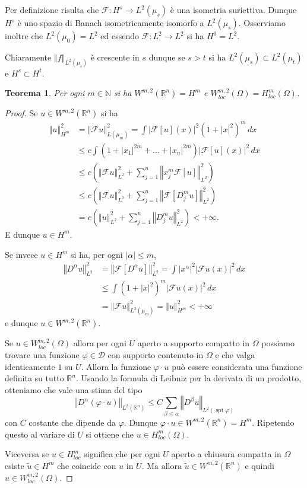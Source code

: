 \documentclass[italian,a4paper,oneside,headinclude]{scrbook}
\renewcommand{\phi}{\varphi}
\newcommand{\loc}{\mathit{loc}}
\newcommand{\D}{\mathcal D}
\newcommand{\F}{\mathcal F}
\newcommand{\NN}{\mathbb N}
\newcommand{\RR}{\mathbb R}
\newcommand{\abs}[1]{{\left|#1\right|}}
\newcommand{\Abs}[1]{{\left\Vert #1\right\Vert}}
\DeclareMathOperator{\spt}{spt}
\newtheorem{theorem}{Teorema}
\begin{document}
  Per definizione risulta che $\F \colon H^s \to L^2(\mu_s)$ è una
  isometria suriettiva. Dunque $H^s$ è uno spazio di Banach
  isometricamente isomorfo a $L^2(\mu_s)$. Osserviamo inoltre che
  $L^2(\mu_0) = L^2$ ed essendo $\F\colon L^2 \to L^2$ si ha
  $H^0=L^2$.

  Chiaramente $\Abs{f}_{L^2(\mu_s)}$ è crescente in $s$ dunque se
  $s>t$ si ha $L^2(\mu_s) \subset L^2(\mu_t)$ e $H^s \subset H^t$.

  \begin{theorem}
    Per ogni $m\in \NN$ si ha $W^{m,2}(\RR^n) = H^m$ e
    $W^{m,2}_\loc(\Omega) = H^m_\loc(\Omega)$.
  \end{theorem}
  \begin{proof}
    Se $u \in W^{m,2}(\RR^n)$ si ha
    \begin{align*}
      \Abs{u}_{H^m}^2
      &= \Abs{\F u}_{L(\mu_m)}^2
      = \int \abs{\F[u](x)}^2 (1+\abs{x}^2)^m\, dx \\
      &\le c \int (1+\abs{x_1}^{2m} + \dots + \abs{x_n}^{2m})
      \abs{\F[u](x)}^2\, dx \\
      & \le c \left( \Abs{\F u}_{L^2}^2 + \sum_{j=1}^n \Abs{x_j^m
        \F[u]}_{L^2}^2\right)\\
      &\le c \left( \Abs{\F u}_{L^2}^2 + \sum_{j=1}^n \Abs{\F[D_j^m
        u]}_{L^2}^2\right) \\
      & = c\left(\Abs{u}_{L^2}^2 + \sum_{j=1}^n \Abs{D_j^m u}_{L^2}^2\right)
      < +\infty.
    \end{align*}
    E dunque $u\in H^m$.

    Se invece $u\in H^m$ si ha, per ogni $\abs{\alpha}\le m$,
    \begin{align*}
      \Abs{D^\alpha u}_{L^2}^2
      & = \Abs{\F[D^\alpha u]}_{L^2}^2
      = \int \abs{x^\alpha}^2 \abs{\F u(x)}^2 \, dx \\
      &\le \int (1+\abs{x}^2)^m \abs{\F u(x)}^2\, dx \\
      &= \Abs{\F u}_{L^2(\mu_m)}^2 = \Abs{u}_{H^m}^2 < +\infty
    \end{align*}
    e dunque $u\in W^{m,2}(\RR^n)$.

    Se $u\in W^{m,2}_\loc(\Omega)$ allora per ogni $U$ aperto a
    supporto compatto in $\Omega$ possiamo trovare una funzione
    $\phi\in \D$ con supporto contenuto in $\Omega$ e che valga
    identicamente $1$ su $U$. Allora la funzione $\phi \cdot u$ può
    essere considerata una funzione definita su tutto $\RR^n$.
    Usando la formula di Leibniz per la derivata di un prodotto,
    otteniamo che vale una stima del tipo
    \[
    \Abs{D^\alpha(\phi\cdot u)}_{L^2(\RR^n)} \le C \sum_{\beta\le
      \alpha} \Abs{D^\beta u}_{L^2(\spt \phi)}
    \]
    con $C$ costante che dipende da $\phi$.
    Dunque $\phi\cdot u \in W^{m,2}(\RR^n) = H^m$.
    Ripetendo questo al
    variare di $U$ si ottiene che $u\in H^m_\loc(\Omega)$.

    Viceversa se $u\in H^m_\loc$ significa che per ogni $U$ aperto a
    chiusura compatta in $\Omega$ esiste $\tilde u \in H^m$ che
    coincide con $u$ in $U$. Ma allora $\tilde u \in W^{m,2}(\RR^n)$ e
    quindi $u \in W^{m,2}_\loc(\Omega)$.
  \end{proof}
\end{document}
